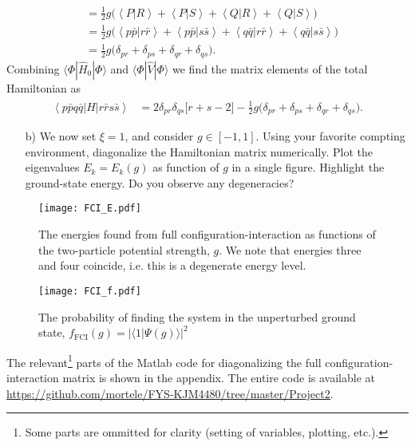 \documentclass[a4paper]{article}
\newcommand{\nn}{\nonumber}
\begin{document}
\begin{align}
&= \frac{1}{2}g \Big(   \left\langle P\big| R\right\rangle + \left\langle P\big| S\right\rangle  + \left\langle Q\big| R\right\rangle  + \left\langle Q\big| S\right\rangle  \Big) \nn\\
%
&= \frac{1}{2}g \Big(   \left\langle p\bar p | r \bar r\right\rangle + \left\langle p \bar p| s\bar s\right\rangle  + \left\langle q \bar q| r \bar r\right\rangle  + \left\langle q\bar q|s \bar s\right\rangle  \Big) \nn\\
%
&= \frac{1}{2}g \Big( \delta_{pr} + \delta_{ps} + \delta_{qr} + \delta_{qs}\Big).
\end{align}
Combining $\langle \Phi | \hat H_0 | \Phi \rangle$ and $\langle \Phi | \hat V | \Phi \rangle$ we find the matrix elements of the total Hamiltonian as 
\begin{align}
\left\langle p\bar p q\bar q \right| \hat H \left| r \bar r s \bar s \right\rangle &= 2\delta_{pr}\delta_{qs} \big[r+s-2\big] - \frac{1}{2}g \Big( \delta_{pr} + \delta_{ps} + \delta_{qr} + \delta_{qs}\Big). \label{eq:5}
\end{align}

\begin{exframe}
\begin{itemize}
  \item[b)] We now set $\xi=1$, and consider $g\in [-1,1]$. Using your favorite compting environment, diagonalize the Hamiltonian matrix numerically. Plot the eigenvalues $E_k=E_k(g)$ as function of $g$ in a single figure. Highlight the ground-state energy. Do you observe any degeneracies?
\end{itemize}
\end{exframe}
\begin{figure}
\centering
\texttt{[image: FCI\_E.pdf]}
\caption{The energies found from full configuration-interaction as functions of the two-particle potential strength, $g$. We note that energies three and four coincide, i.e. this is a degenerate energy level. \label{fig:2}}
\end{figure}
\begin{figure}
\centering
\texttt{[image: FCI\_f.pdf]}
\caption{The probability of finding the system in the unperturbed ground state, $f_\text{FCI}(g)=|\langle 1|\Psi(g)\rangle|^2$\label{fig:3}}
\end{figure}
The relevant\footnote{Some parts are ommitted for clarity (setting of variables, plotting, etc.).} parts of the {\sc Matlab} code for diagonalizing the full configuration-interaction matrix is shown in the appendix. The entire code is available at \url{https://github.com/mortele/FYS-KJM4480/tree/master/Project2}.
\end{document}
